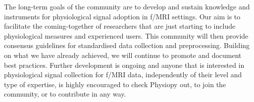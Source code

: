 \documentclass[../main.tex]{subfiles}
\begin{document}
The long-term goals of the community are to develop and sustain knowledge and instruments for physiological signal adoption in f/MRI settings. Our aim is to facilitate the coming-together of researchers that are just starting to include physiological measures and experienced users. This community will then provide consensus guidelines for standardised data collection and preprocessing. Building on what we have already achieved, we will continue to promote and document best practices. Further development is ongoing and anyone that is interested in physiological signal collection for f/MRI data, independently of their level and type of expertise, is highly encouraged to check Physiopy out, to join the community, or to contribute in any way.


\printbibliography
\end{document}
